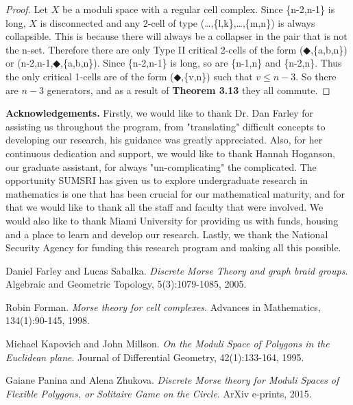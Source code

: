 \documentclass{amsart}
\begin{document}
\begin{proof}
Let $X$ be a moduli space with a regular cell complex. Since \{n-2,n-1\} is long, $X$ is disconnected and any 2-cell of type (\ldots,\{l,k\},\ldots,\{m,n\}) is always collapsible. This is because there will always be a collapser in the pair that is not the n-set. Therefore there are only Type II critical 2-cells of the form ($\Diamondblack$,\{a,b,n\}) or (n-2,n-1,$\Diamondblack$,\{a,b,n\}). Since \{n-2,n-1\} is long, so are \{n-1,n\} and \{n-2,n\}. Thus the only critical 1-cells are of the form ($\Diamondblack$,\{v,n\}) such that $v\leq n-3$. So there are $n-3$ generators, and as a result of \textbf{Theorem 3.13} they all commute.

\end{proof}




\textbf{Acknowledgements.} Firstly, we would like to thank Dr. Dan Farley for assisting us throughout the program, from "translating" difficult concepts to developing our research, his guidance was greatly appreciated. Also, for her continuous dedication and support, we would like to thank Hannah Hoganson, our graduate assistant, for always "un-complicating" the complicated. The opportunity SUMSRI has given us to explore undergraduate research in mathematics is one that has been crucial for our mathematical maturity, and for that we would like to thank all the staff and faculty that were involved. We would also like to thank Miami University for providing us with funds, housing and a place to learn and develop our research. Lastly, we thank the National Security Agency for funding this research program and making all this possible.


\newpage
\begin{thebibliography}{4}

Daniel Farley and Lucas Sabalka. 
\textit{Discrete Morse Theory and graph braid groups}. 
Algebraic and Geometric Topology, 5(3):1079-1085, 2005.

Robin Forman. 
\textit{Morse theory for cell complexes}. 
Advances in Mathematics, 134(1):90-145, 1998.

Michael Kapovich and John Millson. 
\textit{On the Moduli Space of Polygons in the Euclidean plane}. 
Journal of Differential Geometry, 42(1):133-164, 1995.

Gaiane Panina and Alena Zhukova. 
\textit{Discrete Morse theory for Moduli Spaces of Flexible Polygons, or Solitaire Game on the Circle}. 
ArXiv e-prints, 2015.

\end{thebibliography}
\end{document}
